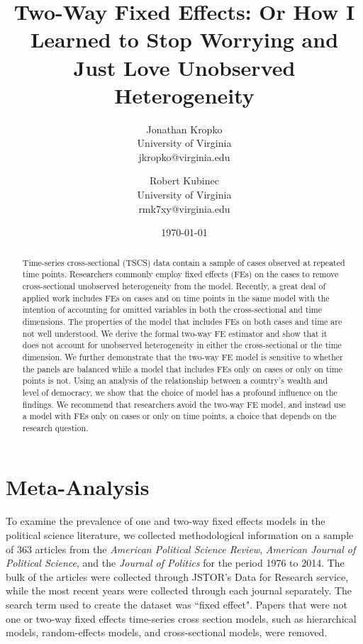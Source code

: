 \documentclass{article}[12pt]
\begin{document}
\title{Two-Way Fixed Effects: Or How I Learned to Stop Worrying and Just Love Unobserved Heterogeneity}
\date{\today}
\author{Jonathan Kropko\\ University of Virginia \\ jkropko@virginia.edu \and Robert Kubinec \\University of Virginia\\rmk7xy@virginia.edu}
\maketitle
\begin{abstract}
\noindent Time-series cross-sectional (TSCS) data contain a sample of cases observed at repeated time points.  Researchers commonly employ fixed effects (FEs) on the cases to remove cross-sectional unobserved heterogeneity from the model.  Recently, a great deal of applied work includes FEs on cases and on time points in the same model with the intention of accounting for omitted variables in both the cross-sectional and time dimensions.  The properties of the model that includes FEs on both cases and time are not well understood.  We derive the formal two-way FE estimator and show that it does not account for unobserved heterogeneity in either the cross-sectional or the time dimension.  We further demonstrate that the two-way FE model is sensitive to whether the panels are balanced while a model that includes FEs only on cases or only on time points is not.  Using an analysis of the relationship between a country's wealth and level of democracy, we show that the choice of model has a profound influence on the findings.  We recommend that researchers avoid the two-way FE model, and instead use a model with FEs only on cases or only on time points, a choice that depends on the research question. 
\end{abstract}

\newpage

\section{Meta-Analysis}

To examine the prevalence of one and two-way fixed effects models in the political science literature, we collected methodological information on a sample of 363 articles from the \emph{American Political Science Review}, \emph{American Journal of Political Science}, and the \emph{Journal of Politics} for the period 1976 to 2014. The bulk of the articles were collected through JSTOR's Data for Research service, while the most recent years were collected through each journal separately. The search term used to create the dataset was ``fixed effect". Papers that were not one or two-way fixed effects time-series cross section models, such as hierarchical models, random-effects models, and cross-sectional models, were removed.
\end{document}
